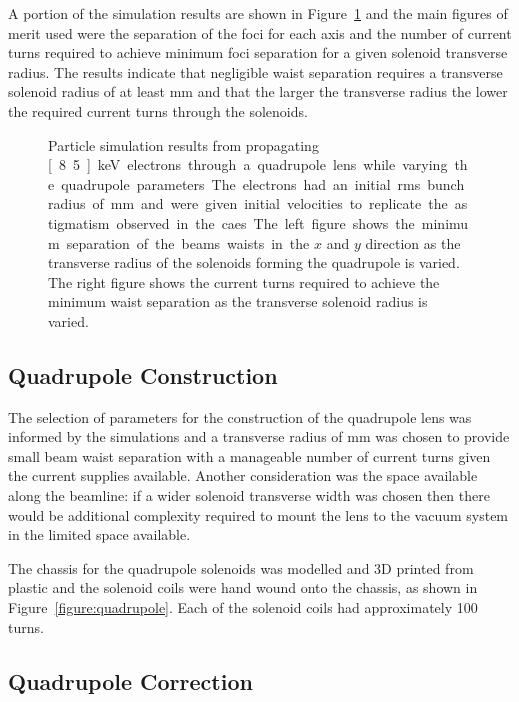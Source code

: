 A portion of the simulation results are shown in Figure~\ref{figure:quad_sims} and the main figures of merit used were the separation of the foci for each axis and the number of current turns required to achieve minimum foci separation for a given solenoid transverse radius.
The results indicate that negligible waist separation requires a transverse solenoid radius of at least \unit[35]{mm} and that the larger the transverse radius the lower the required current turns through the solenoids.

\begin{figure}
    \centering
    
    \caption[Quadrupole simulation results.]{Particle simulation results from propagating \unit[8.5]{keV} electrons through a quadrupole lens while varying the quadrupole parameters. The electrons had an initial \gls{rms} bunch radius of \unit[5]{mm} and were given initial velocities to replicate the astigmatism observed in the \gls{caes}. The left figure shows the minimum separation of the beams waists in the $x$ and $y$ direction as the transverse radius of the solenoids forming the quadrupole is varied. The right figure shows the current turns required to achieve the minimum waist separation as the transverse solenoid radius is varied.}
    \label{figure:quad_sims}
\end{figure}

\subsection{Quadrupole Construction}

The selection of parameters for the construction of the quadrupole lens was informed by the simulations and a transverse radius of \unit[35]{mm} was chosen to provide small beam waist separation with a manageable number of current turns given the current supplies available.
Another consideration was the space available along the beamline: if a wider solenoid transverse width was chosen then there would be additional complexity required to mount the lens to the vacuum system in the limited space available.

The chassis for the quadrupole solenoids was modelled and 3D printed from plastic and the solenoid coils were hand wound onto the chassis, as shown in Figure~\ref{figure:quadrupole}.
Each of the solenoid coils had approximately 100 turns.

\subsection{Quadrupole Correction}

